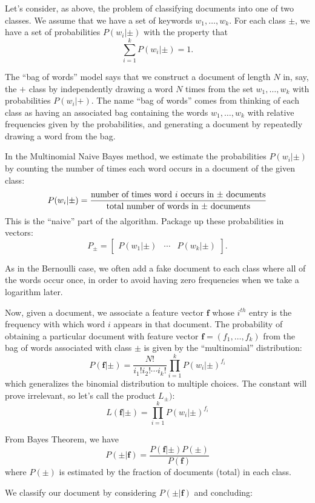 \documentclass[
]{article}
\begin{document}
Let's consider, as above, the problem of classifying documents into one
of two classes. We assume that we have a set of keywords
\(w_1,\ldots, w_k\). For each class \(\pm\), we have a set of
probabilities \(P(w_i|\pm)\) with the property that \[
\sum_{i=1}^{k}P(w_{i}|\pm)=1.
\]

The ``bag of words'' model says that we construct a document of length
\(N\) in, say, the \(+\) class by independently drawing a word \(N\)
times from the set \(w_1,\ldots, w_k\) with probabilities
\(P(w_{i}|+)\). The name ``bag of words'' comes from thinking of each
class as having an associated bag containing the words
\(w_1,\ldots, w_k\) with relative frequencies given by the
probabilities, and generating a document by repeatedly drawing a word
from the bag.

In the Multinomial Naive Bayes method, we estimate the probabilities
\(P(w_{i}|\pm)\) by counting the number of times each word occurs in a
document of the given class: \[
P(w_{i}|\pm) = \frac{\hbox{\rm number of times word $i$ occurs in $\pm$ documents}}{\hbox{\rm total number of words in $\pm$ documents}}
\] This is the ``naive'' part of the algorithm. Package up these
probabilities in vectors: \[
P_{\pm} = \left[\begin{array}{ccc} P(w_{1}|\pm) & \cdots & P(w_{k}|\pm)\end{array}\right].
\]

As in the Bernoulli case, we often add a fake document to each class
where all of the words occur once, in order to avoid having zero
frequencies when we take a logarithm later.

Now, given a document, we associate a feature vector \(\mathbf{f}\)
whose \(i^{th}\) entry is the frequency with which word \(i\) appears in
that document. The probability of obtaining a particular document with
feature vector \(\mathbf{f}=(f_1,\ldots, f_k)\) from the bag of words
associated with class \(\pm\) is given by the ``multinomial''
distribution: \[
P(\mathbf{f}|\pm)=\frac{N!}{i_1!i_2!\cdots i_k!} \prod_{i=1}^{k} P(w_{i}|\pm)^{f_{i}}
\] which generalizes the binomial distribution to multiple choices. The
constant will prove irrelevant, so let's call the product \(L_{\pm})\):
\[
L(\mathbf{f}|\pm)= \prod_{i=1}^{k} P(w_{i}|\pm)^{f_{i}}
\]

From Bayes Theorem, we have \[
P(\pm|\mathbf{f}) = \frac{P(\mathbf{f}|\pm)P(\pm)}{P(\mathbf{f})}
\] where \(P(\pm)\) is estimated by the fraction of documents (total) in
each class.

We classify our document by considering \(P(\pm|\mathbf{f})\) and
concluding:
\end{document}
